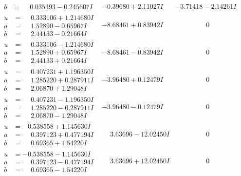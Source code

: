\documentclass[1p]{elsarticle_modified}
\theoremstyle{definition}
\begin{document}
$$\begin{array}{c|c|c}
\begin{aligned}
b &= \phantom{-}0.035393 - 0.245607 I\end{aligned}
 & -0.39680 + 2.11027 I & -3.71418 - 2.14261 I \\ \hline\begin{aligned}
u &= \phantom{-}0.333106 + 1.214680 I \\
a &= \phantom{-}1.52890 - 0.65967 I \\
b &= \phantom{-}2.44133 - 0.21664 I\end{aligned}
 & -8.68461 + 0.83942 I & \phantom{-0.000000 } 0 \\ \hline\begin{aligned}
u &= \phantom{-}0.333106 - 1.214680 I \\
a &= \phantom{-}1.52890 + 0.65967 I \\
b &= \phantom{-}2.44133 + 0.21664 I\end{aligned}
 & -8.68461 - 0.83942 I & \phantom{-0.000000 } 0 \\ \hline\begin{aligned}
u &= \phantom{-}0.407231 + 1.196350 I \\
a &= \phantom{-}1.285220 + 0.287911 I \\
b &= \phantom{-}2.06870 + 1.29048 I\end{aligned}
 & -3.96480 + 0.12479 I & \phantom{-0.000000 } 0 \\ \hline\begin{aligned}
u &= \phantom{-}0.407231 - 1.196350 I \\
a &= \phantom{-}1.285220 - 0.287911 I \\
b &= \phantom{-}2.06870 - 1.29048 I\end{aligned}
 & -3.96480 - 0.12479 I & \phantom{-0.000000 } 0 \\ \hline\begin{aligned}
u &= -0.538558 + 1.145630 I \\
a &= \phantom{-}0.397123 + 0.477194 I \\
b &= \phantom{-}0.69365 + 1.54220 I\end{aligned}
 & \phantom{-}3.63696 - 12.02450 I & \phantom{-0.000000 } 0 \\ \hline\begin{aligned}
u &= -0.538558 - 1.145630 I \\
a &= \phantom{-}0.397123 - 0.477194 I \\
b &= \phantom{-}0.69365 - 1.54220 I\end{aligned}
 & \phantom{-}3.63696 + 12.02450 I & \phantom{-0.000000 } 0\\

\end{array}$$
\end{document}
